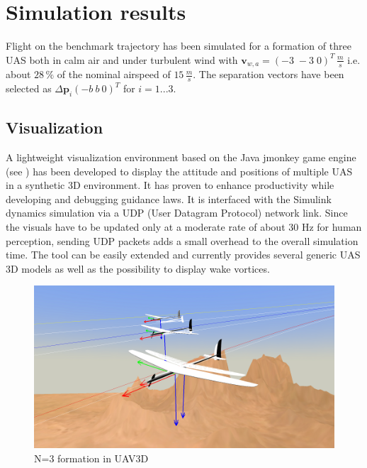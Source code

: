 \documentclass{ifacconf}
\newcommand{\mbf}[1]{\mathbf{#1}}
\providecommand{\mbf}[1]{\mathbf{#1}}
\begin{document}
\section{Simulation results}
\label{sec:simresults}
Flight on the benchmark trajectory has been simulated for a formation of three UAS both in calm air and under turbulent wind with $\mbf{v}_{w,a} = (-3 \; -3 \; 0)^T \, \frac{m}{s}$ i.e. about $28 \, \%$ of the nominal airspeed of $15 \, \frac{m}{s}$. The separation vectors have been selected as $\Delta \mbf{p}_i (-b \: b \: 0)^T$ for $i=1...3$.
\subsection{Visualization}
A lightweight visualization environment based on the Java jmonkey game engine (see \cite{jmonkeyengine}) has been developed to display the attitude and positions of multiple UAS in a synthetic 3D environment. 
It has proven to enhance productivity while developing and debugging guidance laws. 
It is interfaced with the Simulink dynamics simulation via a UDP (User Datagram Protocol) network link. Since the visuals have to be updated only at a moderate rate of about 30 Hz for human perception, sending UDP packets adds a small overhead to the overall simulation time. The tool can be easily extended and currently provides several generic UAS 3D models as well as the possibility to display wake vortices.
\begin{figure}
\centering
\includegraphics[width=.8\columnwidth]{UAV3D_N=3-lowres}
\caption{N=3 formation in UAV3D}
\end{figure}
\end{document}
